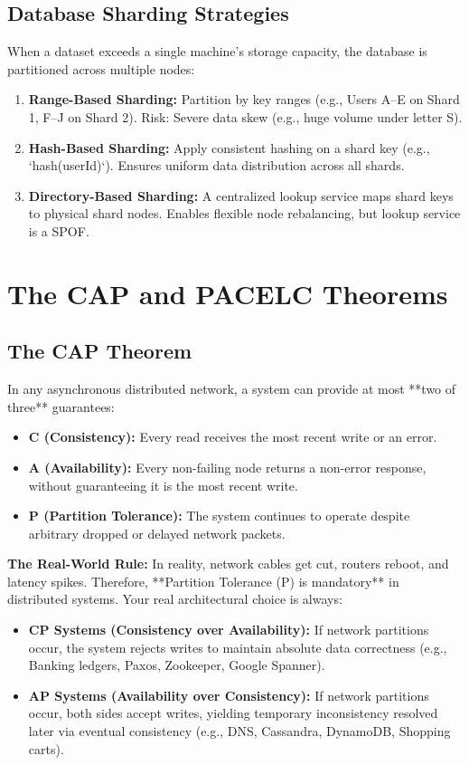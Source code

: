 \documentclass[10pt,journal,compsoc,onecolumn]{IEEEtran}
\begin{document}
\subsection{Database Sharding Strategies}
When a dataset exceeds a single machine's storage capacity, the database is partitioned across multiple nodes:
\begin{enumerate}
    \item \textbf{Range-Based Sharding:} Partition by key ranges (e.g., Users A--E on Shard 1, F--J on Shard 2). Risk: Severe data skew (e.g., huge volume under letter S).
    \item \textbf{Hash-Based Sharding:} Apply consistent hashing on a shard key (e.g., `hash(userId)`). Ensures uniform data distribution across all shards.
    \item \textbf{Directory-Based Sharding:} A centralized lookup service maps shard keys to physical shard nodes. Enables flexible node rebalancing, but lookup service is a SPOF.
\end{enumerate}

\section{The CAP and PACELC Theorems}
\label{sec:cap}

\subsection{The CAP Theorem}
In any asynchronous distributed network, a system can provide at most **two of three** guarantees:
\begin{itemize}
    \item \textbf{C (Consistency):} Every read receives the most recent write or an error.
    \item \textbf{A (Availability):} Every non-failing node returns a non-error response, without guaranteeing it is the most recent write.
    \item \textbf{P (Partition Tolerance):} The system continues to operate despite arbitrary dropped or delayed network packets.
\end{itemize}

\textbf{The Real-World Rule:} In reality, network cables get cut, routers reboot, and latency spikes. Therefore, **Partition Tolerance (P) is mandatory** in distributed systems. Your real architectural choice is always:
\begin{itemize}
    \item \textbf{CP Systems (Consistency over Availability):} If network partitions occur, the system rejects writes to maintain absolute data correctness (e.g., Banking ledgers, Paxos, Zookeeper, Google Spanner).
    \item \textbf{AP Systems (Availability over Consistency):} If network partitions occur, both sides accept writes, yielding temporary inconsistency resolved later via eventual consistency (e.g., DNS, Cassandra, DynamoDB, Shopping carts).
\end{itemize}
\end{document}
